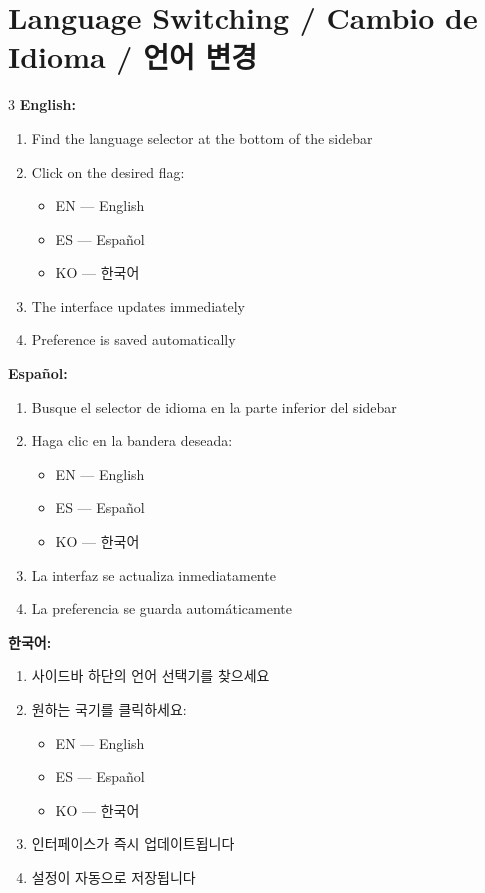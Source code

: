 \documentclass[12pt,a4paper]{article}
\begin{document}
\section{Language Switching / Cambio de Idioma / 언어 변경}

\begin{multicols}{3}
\textbf{English:}
\begin{enumerate}[leftmargin=*]
\item Find the language selector at the bottom of the sidebar
\item Click on the desired flag:
  \begin{itemize}
  \item EN — English
  \item ES — Español
  \item KO — 한국어
  \end{itemize}
\item The interface updates immediately
\item Preference is saved automatically
\end{enumerate}

\columnbreak
\textbf{Español:}
\begin{enumerate}[leftmargin=*]
\item Busque el selector de idioma en la parte inferior del sidebar
\item Haga clic en la bandera deseada:
  \begin{itemize}
  \item EN — English
  \item ES — Español
  \item KO — 한국어
  \end{itemize}
\item La interfaz se actualiza inmediatamente
\item La preferencia se guarda automáticamente
\end{enumerate}

\columnbreak
\textbf{한국어:}
\begin{enumerate}[leftmargin=*]
\item 사이드바 하단의 언어 선택기를 찾으세요
\item 원하는 국기를 클릭하세요:
  \begin{itemize}
  \item EN — English
  \item ES — Español
  \item KO — 한국어
  \end{itemize}
\item 인터페이스가 즉시 업데이트됩니다
\item 설정이 자동으로 저장됩니다
\end{enumerate}
\end{multicols}
\end{document}
